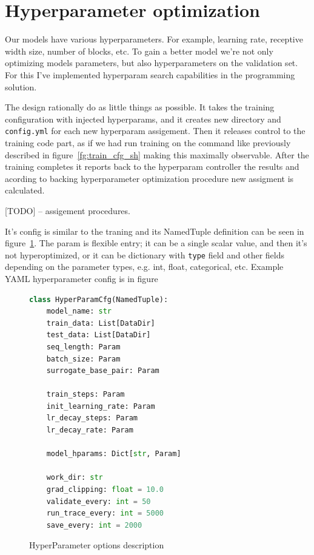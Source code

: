 \documentclass[times, utf8, diplomski, english]{fer}
\begin{document}
\section{Hyperparameter optimization}

Our models have various hyperparameters. For example, learning rate, receptive width size, number of blocks, etc. To gain a better model we're not only optimizing models parameters, but also hyperparameters on the validation set. For this I've implemented hyperparam search capabilities in the programming solution. 

The design rationally do as little things as possible. It takes the training configuration with injected hyperparams, and it creates new directory and \texttt{config.yml} for each new hyperparam assigement. Then it releases control to the training code part, as if we had run training on the command like previously described in figure~\ref{fg:train_cfg_sh} making this maximally observable. After the training completes it reports back to the hyperparam controller the results and acording to backing hyperparameter optimization procedure new assigment is calculated.

[TODO] -- assigement procedures.

It's config is similar to the traning and its NamedTuple definition can be seen in figure~\ref{fg:hyper_cfg_py}. The param is flexible entry; it can be a single scalar value, and then it's not hyperoptimized, or it can be dictionary with \texttt{type} field and other fields depending on the parameter types, e.g. int, float, categorical, etc. Example YAML hyperparameter config is in figure~\ 

\begin{figure}
    \begin{center}
    \begin{lstlisting}[language=python,style=protobuf]
class HyperParamCfg(NamedTuple):
    model_name: str
    train_data: List[DataDir]
    test_data: List[DataDir]
    seq_length: Param
    batch_size: Param
    surrogate_base_pair: Param

    train_steps: Param
    init_learning_rate: Param
    lr_decay_steps: Param
    lr_decay_rate: Param

    model_hparams: Dict[str, Param]

    work_dir: str
    grad_clipping: float = 10.0
    validate_every: int = 50
    run_trace_every: int = 5000
    save_every: int = 2000
    \end{lstlisting}
    \caption{HyperParameter options description}
    \label{fg:hyper_cfg_py}
    \end{center}
\end{figure}
\end{document}
